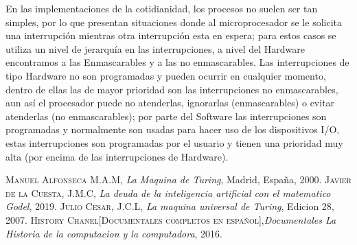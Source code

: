 \documentclass{article}
\begin{document}
En las implementaciones de la cotidianidad, los procesos no suelen ser tan simples, por lo que presentan situaciones donde al microprocesador se le solicita una interrupción mientras otra interrupción esta en espera; para estos casos se utiliza un nivel de jerarquía en las interrupciones, a nivel del Hardware encontramos a las Enmascarables y a las no enmascarables. Las interrupciones de tipo Hardware no son programadas y pueden ocurrir en cualquier momento, dentro de ellas las de mayor prioridad son las interrupciones no enmascarables, aun así el procesador puede no atenderlas, ignorarlas (enmascarables) o evitar atenderlas (no enmascarables); por parte del Software las interrupciones son programadas y normalmente son usadas para hacer uso de los dispositivos  I/O, estas interrupciones son programadas por el usuario y tienen una prioridad muy alta (por encima de las interrupciones de Hardware).\\



\newpage


\begin{thebibliography}{X}
 \textsc{Manuel Alfonseca M.A.M},
\textit{La Maquina de Turing}, Madrid, España, 2000. \textsc{Javier de la Cuesta, J.M.C},\textit{ La deuda de la inteligencia artificial con el matematico Godel}, 2019.
 \textsc{Julio Cesar, J.C.L},\textit{ La maquina universal de Turing}, Edicion 28, 2007.
 \textsc{History Chanel[Documentales completos en español]},\textit{Documentales La Historia de la computacion y la computadora}, 2016.
\end{thebibliography}
\end{document}
